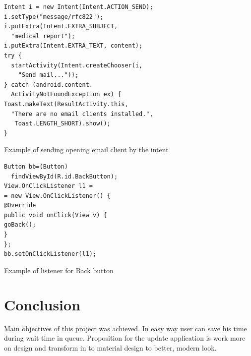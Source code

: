 \documentclass[conference]{IEEEtran}
\begin{document}
\begin{lstlisting}[frame=single]
Intent i = new Intent(Intent.ACTION_SEND);
i.setType("message/rfc822");
i.putExtra(Intent.EXTRA_SUBJECT, 
  "medical report");
i.putExtra(Intent.EXTRA_TEXT, content);
try {
  startActivity(Intent.createChooser(i, 
    "Send mail..."));
} catch (android.content.
  ActivityNotFoundException ex) {
Toast.makeText(ResultActivity.this, 
  "There are no email clients installed.",
   Toast.LENGTH_SHORT).show();
}
\end{lstlisting}
Example of sending opening email client by the intent\\

\begin{lstlisting}[frame=single]
Button bb=(Button)
  findViewById(R.id.BackButton);
View.OnClickListener l1 =
= new View.OnClickListener() {
@Override
public void onClick(View v) {
goBack();
}
};
bb.setOnClickListener(l1);
\end{lstlisting}
Example of listener for Back button\\


\section{Conclusion}
Main objectives of this project was achieved. In easy way user can save his time during wait time in queue. Proposition for the update application is work more on design and transform in to material design to better, modern look.









\end{document}
